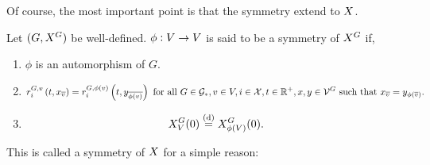 Of course, the most important point is that the symmetry extend to \(X\).

\begin{defn}
\label{na::Xsim}

Let \((G,X^{G})\) be well-defined. \(\phi:V \rightarrow V\) is said to be a symmetry of \(X^{G}\) if,

\begin{enumerate}
\item \(\phi\) is an automorphism of \(G\).

\item 

\[\rate\gvpara{G}{v}\stpara{i}\tmepro{t}{\xf\vind{\cl{v}}}{} = \rate\gvpara{G}{\phi(v)}\stpara{i}\tmepro{t}{\xg\vind{\cl{\phi(v)}}}{} \te{ for all } G\in \Gs, v \in V,i\in \sta, t \in \mb{R}^+, \xf,\xg \in \valid\gind{G}\te{ such that } \xf\vind{\cl{v}} = \xg\vind{\phi(\cl{v})}.\]

\item 

\[X^{G}_{V}(0) \overset{\text{(d)}}{=} X^{G}_{\phi(V)}(0).\]
\end{enumerate}
\end{defn}

This is called a symmetry of \(X\) for a simple reason:

